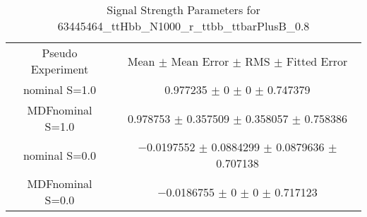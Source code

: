 \begin{table}
\centering
\caption{Signal Strength Parameters for 63445464\_ttHbb\_N1000\_r\_ttbb\_ttbarPlusB\_0.8}
\begin{tabular}{cc}
\toprule
Pseudo Experiment & Mean $\pm$ Mean Error $\pm$ RMS $\pm$ Fitted Error\\
nominal S=1.0 & \num{0.977235} $\pm$ \num{0} $\pm$ \num{0} $\pm$ \num{0.747379}\\
MDFnominal S=1.0 & \num{0.978753} $\pm$ \num{0.357509} $\pm$ \num{0.358057} $\pm$ \num{0.758386}\\
nominal S=0.0 & \num{-0.0197552} $\pm$ \num{0.0884299} $\pm$ \num{0.0879636} $\pm$ \num{0.707138}\\
MDFnominal S=0.0 & \num{-0.0186755} $\pm$ \num{0} $\pm$ \num{0} $\pm$ \num{0.717123}\\
\bottomrule
\end{tabular}
\end{table}